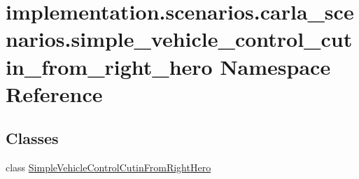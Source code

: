 \hypertarget{namespaceimplementation_1_1scenarios_1_1carla__scenarios_1_1simple__vehicle__control__cutin__from__right__hero}{}\section{implementation.\+scenarios.\+carla\+\_\+scenarios.\+simple\+\_\+vehicle\+\_\+control\+\_\+cutin\+\_\+from\+\_\+right\+\_\+hero Namespace Reference}
\label{namespaceimplementation_1_1scenarios_1_1carla__scenarios_1_1simple__vehicle__control__cutin__from__right__hero}
\subsection*{Classes}
\begin{DoxyCompactItemize}
\item 
class \hyperlink{classimplementation_1_1scenarios_1_1carla__scenarios_1_1simple__vehicle__control__cutin__from__r6474a3ad40f8613a989008f8fef990bd}{Simple\+Vehicle\+Control\+Cutin\+From\+Right\+Hero}
\end{DoxyCompactItemize}
